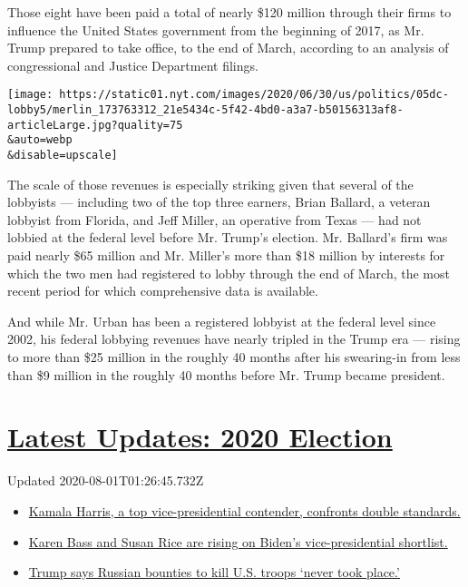 Those eight have been paid a total of nearly \$120 million through their
firms to influence the United States government from the beginning of
2017, as Mr. Trump prepared to take office, to the end of March,
according to an analysis of congressional and Justice Department
filings.

\texttt{[image: https://static01.nyt.com/images/2020/06/30/us/politics/05dc-lobby5/merlin\_173763312\_21e5434c-5f42-4bd0-a3a7-b50156313af8-articleLarge.jpg?quality=75\\\&auto=webp\\\&disable=upscale]}

The scale of those revenues is especially striking given that several of
the lobbyists --- including two of the top three earners, Brian Ballard,
a veteran lobbyist from Florida, and Jeff Miller, an operative from
Texas --- had not lobbied at the federal level before Mr. Trump's
election. Mr. Ballard's firm was paid nearly \$65 million and Mr.
Miller's more than \$18 million by interests for which the two men had
registered to lobby through the end of March, the most recent period for
which comprehensive data is available.

And while Mr. Urban has been a registered lobbyist at the federal level
since 2002, his federal lobbying revenues have nearly tripled in the
Trump era --- rising to more than \$25 million in the roughly 40 months
after his swearing-in from less than \$9 million in the roughly 40
months before Mr. Trump became president.

\hypertarget{latest-updates-2020-election}{%
\section{\texorpdfstring{\href{https://www.nytimes.com/2020/07/31/us/elections/biden-vs-trump.html?action=click\&pgtype=Article\&state=default\&region=MAIN_CONTENT_1\&context=storylines_live_updates}{Latest
Updates: 2020
Election}}{Latest Updates: 2020 Election}}\label{latest-updates-2020-election}}

Updated 2020-08-01T01:26:45.732Z

\begin{itemize}
\tightlist
\item
  \href{https://www.nytimes.com/2020/07/31/us/elections/biden-vs-trump.html?action=click\&pgtype=Article\&state=default\&region=MAIN_CONTENT_1\&context=storylines_live_updates\#link-29fdff45}{Kamala
  Harris, a top vice-presidential contender, confronts double
  standards.}
\item
  \href{https://www.nytimes.com/2020/07/31/us/elections/biden-vs-trump.html?action=click\&pgtype=Article\&state=default\&region=MAIN_CONTENT_1\&context=storylines_live_updates\#link-13ec3d9c}{Karen
  Bass and Susan Rice are rising on Biden's vice-presidential
  shortlist.}
\item
  \href{https://www.nytimes.com/2020/07/31/us/elections/biden-vs-trump.html?action=click\&pgtype=Article\&state=default\&region=MAIN_CONTENT_1\&context=storylines_live_updates\#link-49e9a016}{Trump
  says Russian bounties to kill U.S. troops `never took place.'}
\end{itemize}

